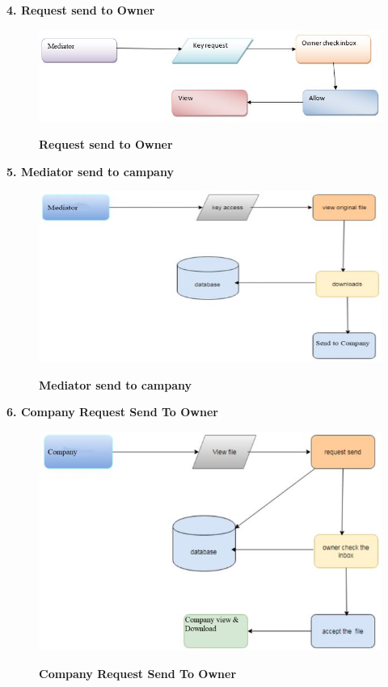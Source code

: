 \documentclass[BTech]{srmuthesis}
\begin{document}
\textbf{4. Request send to Owner}
\begin{figure}[H]
\includegraphics[scale=0.7]{4.jpg}
\label{fig:1}\hspace{10mm}
\caption{\textbf{Request send to Owner}}
\end{figure}
\textbf{5. Mediator send to campany}
\begin{figure}[H]
\includegraphics[scale=0.7]{5.jpg}
\label{fig:1}\hspace{10mm}
\caption{\textbf{Mediator send to campany}}
\end{figure}
\textbf{6. Company Request Send To Owner}
\begin{figure}[H]
\includegraphics[scale=0.7]{6.jpg}
\label{fig:1}\hspace{10mm}
\caption{\textbf{Company Request Send To Owner}}
\end{figure}
\end{document}
